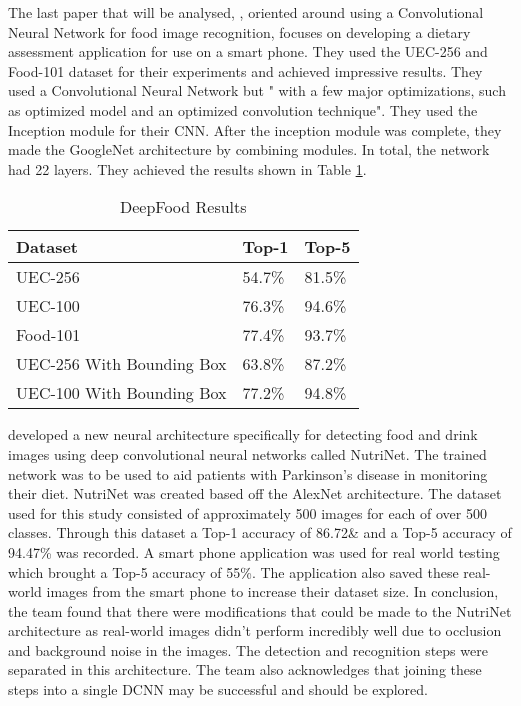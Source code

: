 The last paper that will be analysed, \parencite{deepFood}, oriented around using a Convolutional Neural
Network for food image recognition, focuses on developing a dietary assessment
application for use on a smart phone. They used the UEC-256 and Food-101 dataset
for their experiments and achieved impressive results.
They used a Convolutional Neural Network but " with a few major optimizations,
such as optimized model and an optimized convolution technique". 
They used the Inception module for their CNN. After the
inception module was complete, they made the GoogleNet architecture by combining modules. In
total, the network had 22 layers.
They achieved the results shown in Table \ref{resultsDeepFood}.

\begin{table}[h]
	\centering
	\caption{DeepFood Results}
	\label{resultsDeepFood}
	\begin{tabular}{|l|l|l|}
	\hline
		\textbf{Dataset} & \textbf{Top-1}  & \textbf{Top-5}  \\  \hline
		UEC-256                   & 54.7\% & 81.5\% \\ \hline
		UEC-100                   & 76.3\% & 94.6\% \\ \hline
		Food-101                  & 77.4\% & 93.7\% \\ \hline
		UEC-256 With Bounding Box & 63.8\% & 87.2\% \\ \hline
		  UEC-100 With Bounding Box & 77.2\% & 94.8\% \\ \hline
	\end{tabular}
\end{table}

\parencite{nutrinet} developed a new neural architecture specifically for detecting food and drink images using deep convolutional neural networks called NutriNet.
The trained network was to be used to aid patients with Parkinson's disease in monitoring their diet.
NutriNet was created based off the AlexNet architecture.
The dataset used for this study consisted of approximately 500 images for each of over 500 classes.
Through this dataset a Top-1 accuracy of 86.72\& and a Top-5 accuracy of 94.47\% was recorded.
A smart phone application was used for real world testing which brought a Top-5 accuracy of 55\%.
The application also saved these real-world images from the smart phone to increase their dataset size.
In conclusion, the team found that there were modifications that could be made to the NutriNet architecture as real-world images didn't perform incredibly well due to occlusion and background noise in the images.
The detection and recognition steps were separated in this architecture.
The team also acknowledges that joining these steps into a single DCNN may be successful and should be explored.

